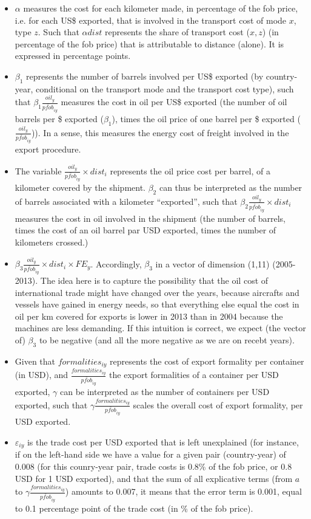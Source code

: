 \documentclass[a4paper,11pt]{article}
\begin{document}
\begin{itemize}
\item $\alpha$ measures the cost for each kilometer made, in percentage of the fob price, i.e. for each US\$ exported, that is involved in the transport cost of mode $x$, type $z$. Such that $\alpha dist$ represents the share of transport cost ($x,z$) (in percentage of the fob price) that is attributable to distance (alone). It is expressed in percentage points.
\item $\beta_1$ represents the number of barrels involved per US\$ exported (by country-year, conditional on the transport mode and the transport cost type), such that $\beta_1\frac{oil_{y}}{\bar{pfob}_{iy}}$ measures the cost in oil per US\$ exported (the number of oil barrels per \$ exported ($\beta_1$), times the oil price of one barrel per \$ exported ($\frac{oil_{y}}{\bar{pfob}_{iy}}$)). In a sense, this measures the energy cost of freight involved in the export procedure.
\item The variable $\frac{oil_{y}}{\bar{pfob}_{iy}}\times dist_{i}$ represents the oil price cost per barrel, of a kilometer covered by the shipment. $\beta_2$ can thus be interpreted as the number of barrels associated with a kilometer ``exported'', such that $\beta_2\frac{oil_{y}}{\bar{pfob}_{iy}}\times dist_{i}$ measures the cost in oil involved in the shipment (the number of barrels, times the cost of an oil barrel par USD exported, times the number of kilometers crossed.)

\item $\beta_3\frac{oil_{y}}{\bar{pfob}_{iy}}\times dist_{i}\times FE_y$. Accordingly, $\beta_3$ in a vector of dimension (1,11) (2005-2013). The idea here is to capture the possibility that the oil cost of international trade might have changed over the years, because aircrafts and vessels have gained in energy needs, so that everything else equal the cost in oil per km covered for exports is lower in 2013 than in 2004 because the machines are less demanding.  If this intuition is correct, we expect (the vector of) $\beta_3$ to be negative (and all the more negative as we are on recebt years).
\item Given that $formalities_{iy}$ represents the cost of export formality per container (in USD), and $\frac{formalities_{iy}}{\bar{pfob}_{iy}}$ the export formalities of a container per USD exported, $\gamma$ can be interpreted as the number of containers per USD exported, such that $\gamma\frac{formalities_{iy}}{\bar{pfob}_{iy}}$ scales the overall cost of export formality, per USD exported.
\item $\varepsilon_{iy}$ is the trade cost per USD exported that is left unexplained (for instance, if on the left-hand side we have a value for a given pair (country-year) of 0.008 (for this counry-year pair, trade costs is 0.8\% of the fob price, or 0.8 USD for 1 USD exported), and that the sum of all explicative terms (from $a$ to $\gamma\frac{formalities_{iy}}{\bar{pfob}_{iy}}$) amounts to 0.007, it means that the error term is 0.001, equal to 0.1 percentage point of the trade cost (in \% of the fob price).

\end{itemize}
\end{document}

